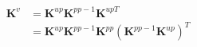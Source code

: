 \begin{equation}
\begin{split}
    \boldsymbol K^v &= \boldsymbol K^{up} \boldsymbol K^{pp-1} \boldsymbol K^{upT} \\
    &= \boldsymbol K^{up} \boldsymbol K^{pp-1} \boldsymbol K^{pp} (\boldsymbol K^{pp-1} \boldsymbol K^{up})^T \\
\end{split}
\end{equation}
